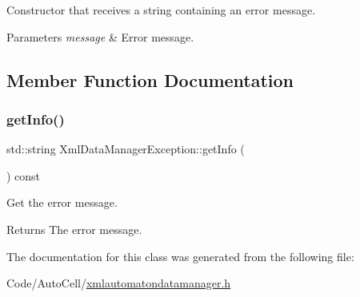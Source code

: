 Constructor that receives a string containing an error message.


\begin{DoxyParams}{Parameters}
{\em message} & Error message. \\
\hline
\end{DoxyParams}


\subsection{Member Function Documentation}
\mbox{\label{class_xml_data_manager_exception_a5b801cba8e8273b070453e51f44f012e}} 
\subsubsection{\texorpdfstring{get\+Info()}{getInfo()}}
{\footnotesize\ttfamily std\+::string Xml\+Data\+Manager\+Exception\+::get\+Info (\begin{DoxyParamCaption}{ }\end{DoxyParamCaption}) const\hspace{0.3cm}{\ttfamily [inline]}}

Get the error message.

\begin{DoxyReturn}{Returns}
The error message. 
\end{DoxyReturn}


The documentation for this class was generated from the following file\+:\begin{DoxyCompactItemize}
\item 
Code/\+Auto\+Cell/\mbox{\hyperlink{xmlautomatondatamanager_8h}{xmlautomatondatamanager.\+h}}\end{DoxyCompactItemize}
